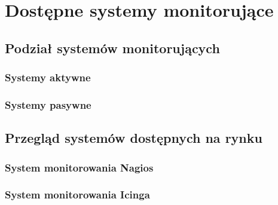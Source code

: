 \chapter{Dostępne systemy monitorujące}

\section[Podział systemów][Podział systemów monitorujących]{Podział systemów monitorujących}

\subsection[Systemy aktywne][Systemy aktywne]{Systemy aktywne}

\subsection[Systemy pasywne][Systemy pasywne]{Systemy pasywne}

\section[Przegląd systemów][Przegląd systemów dostępnych na rynku]{Przegląd systemów dostępnych na rynku}

\subsection[Nagios][System monitorowania Nagios]{System monitorowania Nagios}

\subsection[Icinga][System monitorowania Icinga]{System monitorowania Icinga}



